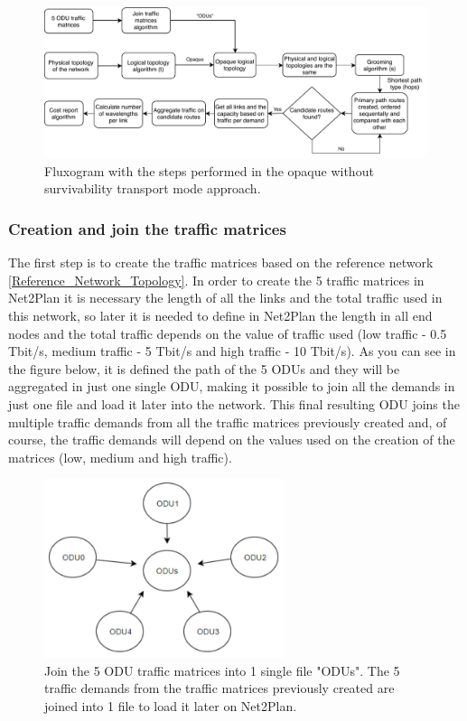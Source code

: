\begin{figure}[H]
\centering
\includegraphics[width=16cm]{sdf/heuristic/opaque_survivability/figures/fluxogram_opaque_surv}
\caption{Fluxogram with the steps performed in the opaque without survivability transport mode approach.}
\label{fluxogram_opaque_surv}
\end{figure}

\newpage
\subsubsection{Creation and join the traffic matrices}

\noindent
The first step is to create the traffic matrices based on the reference network \ref{Reference_Network_Topology}. In order to create the 5 traffic matrices in Net2Plan it is necessary the length of all the links and the total traffic used in this network, so later it is needed to define in Net2Plan the length in all end nodes and the total traffic depends on the value of traffic used (low traffic - 0.5 Tbit/s, medium traffic - 5 Tbit/s and high traffic - 10 Tbit/s). As you can see in the figure below, it is defined the path of the 5 ODUs and they will be aggregated in just one single ODU, making it possible to join all the demands in just one file and load it later into the network. This final resulting ODU joins the multiple traffic demands from all the traffic matrices previously created and, of course, the traffic demands will depend on the values used on the creation of the matrices (low, medium and high traffic).

\begin{figure}[H]
\centering
\includegraphics[width=7cm]{sdf/heuristic/opaque_survivability/figures/join_matrices_odus}
\caption{Join the 5 ODU traffic matrices into 1 single file "ODUs". The 5 traffic demands from the traffic matrices previously created are joined into 1 file to load it later on Net2Plan.}
\label{join_matrices_odus_opaque_surv}
\end{figure}

